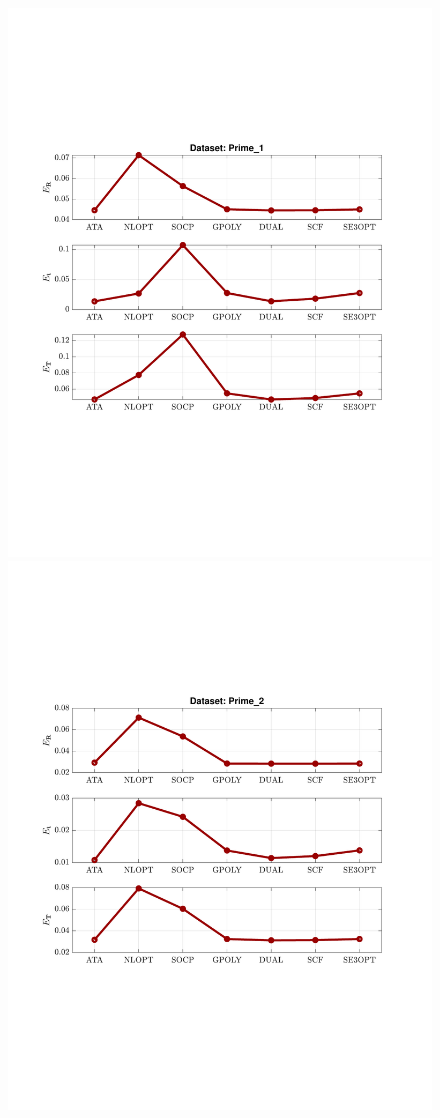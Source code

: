 \begin{figure}
\centering
\includegraphics[scale=0.7]{./hand_eye_figures/real/adv_Result_Prime_1}
\includegraphics[scale=0.7]{./hand_eye_figures/real/adv_Result_Prime_2}

\end{figure}
